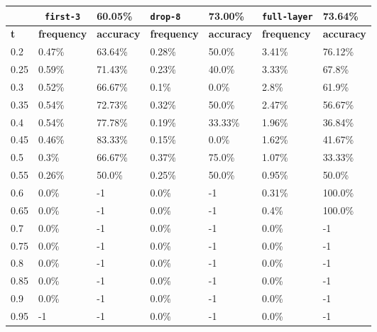
\begin{table}[t]
\centering
\begin{tabular}{lllllll} %
\hline

\multicolumn{1}{c}{}& 
\multicolumn{1}{c}{\texttt{first-3}} & \multicolumn{1}{l|}{60.05\%} 
& \multicolumn{1}{l}{\texttt{drop-8}} & \multicolumn{1}{l|}{73.00\%}
& \multicolumn{1}{l}{\texttt{full-layer}} & 73.64\%
\\ \hline
\multicolumn{1}{l|}{\textbf{t}} &
\multicolumn{1}{l|}{\textbf{frequency}} & 
\multicolumn{1}{l|}{\textbf{accuracy}} & 
\multicolumn{1}{l|}{\textbf{frequency}} & 
\multicolumn{1}{l|}{\textbf{accuracy}} & 
\multicolumn{1}{l|}{\textbf{frequency}} & 
\multicolumn{1}{l|}{\textbf{accuracy}} \\ \hline
	\multicolumn{1}{l|}{0.2}&  0.47\% & \multicolumn{1}{l|}{63.64\%}& 0.28\% & \multicolumn{1}{l|}{50.0\%}& 3.41\% & 76.12\%\\ 
\multicolumn{1}{l|}{0.25}&  0.59\% & \multicolumn{1}{l|}{71.43\%}& 0.23\% & \multicolumn{1}{l|}{40.0\%}& 3.33\% & 67.8\%\\ 
\multicolumn{1}{l|}{0.3}&  0.52\% & \multicolumn{1}{l|}{66.67\%}& 0.1\% & \multicolumn{1}{l|}{0.0\%}& 2.8\% & 61.9\%\\ 
\multicolumn{1}{l|}{0.35}&  0.54\% & \multicolumn{1}{l|}{72.73\%}& 0.32\% & \multicolumn{1}{l|}{50.0\%}& 2.47\% & 56.67\%\\ 
\multicolumn{1}{l|}{0.4}&  0.54\% & \multicolumn{1}{l|}{77.78\%}& 0.19\% & \multicolumn{1}{l|}{33.33\%}& 1.96\% & 36.84\%\\ 
\multicolumn{1}{l|}{0.45}&  0.46\% & \multicolumn{1}{l|}{83.33\%}& 0.15\% & \multicolumn{1}{l|}{0.0\%}& 1.62\% & 41.67\%\\ 
\multicolumn{1}{l|}{0.5}&  0.3\% & \multicolumn{1}{l|}{66.67\%}& 0.37\% & \multicolumn{1}{l|}{75.0\%}& 1.07\% & 33.33\%\\ 
\multicolumn{1}{l|}{0.55}&  0.26\% & \multicolumn{1}{l|}{50.0\%}& 0.25\% & \multicolumn{1}{l|}{50.0\%}& 0.95\% & 50.0\%\\ 
\multicolumn{1}{l|}{0.6}&  0.0\% & \multicolumn{1}{l|}{-1}& 0.0\% & \multicolumn{1}{l|}{-1}& 0.31\% & 100.0\%\\ 
\multicolumn{1}{l|}{0.65}&  0.0\% & \multicolumn{1}{l|}{-1}& 0.0\% & \multicolumn{1}{l|}{-1}& 0.4\% & 100.0\%\\ 
\multicolumn{1}{l|}{0.7}&  0.0\% & \multicolumn{1}{l|}{-1}& 0.0\% & \multicolumn{1}{l|}{-1}& 0.0\% & -1\\ 
\multicolumn{1}{l|}{0.75}&  0.0\% & \multicolumn{1}{l|}{-1}& 0.0\% & \multicolumn{1}{l|}{-1}& 0.0\% & -1\\ 
\multicolumn{1}{l|}{0.8}&  0.0\% & \multicolumn{1}{l|}{-1}& 0.0\% & \multicolumn{1}{l|}{-1}& 0.0\% & -1\\ 
\multicolumn{1}{l|}{0.85}&  0.0\% & \multicolumn{1}{l|}{-1}& 0.0\% & \multicolumn{1}{l|}{-1}& 0.0\% & -1\\ 
\multicolumn{1}{l|}{0.9}&  0.0\% & \multicolumn{1}{l|}{-1}& 0.0\% & \multicolumn{1}{l|}{-1}& 0.0\% & -1\\ 
\multicolumn{1}{l|}{0.95}&  -1 & \multicolumn{1}{l|}{-1}& 0.0\% & \multicolumn{1}{l|}{-1}& 0.0\% & -1\\ 


\end{tabular}
\end{table}
